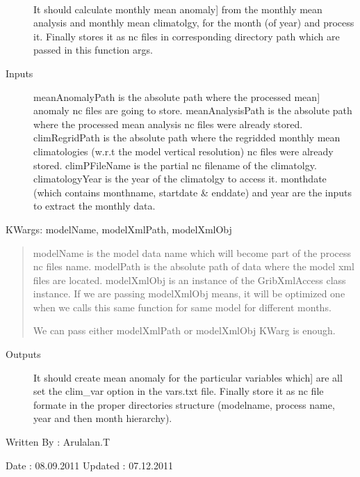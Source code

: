 \documentclass[letterpaper,10pt,english]{sphinxmanual}
\begin{document}
\begin{fulllineitems}
\label{diagnosis:compute_month_anomaly.genMonthAnomalyFiles}~\begin{description}
\item[{}] \leavevmode{[}It should calculate monthly mean anomaly{]}
from the monthly mean analysis and monthly mean climatolgy,
for the month (of year) and process it. Finally
stores it as nc files in corresponding directory path which are
passed in this function args.

\item[{Inputs}] \leavevmode{[}meanAnomalyPath is the absolute path where the processed mean{]}
anomaly nc files are going to store.
meanAnalysisPath is the absolute path where the processed mean
analysis nc files were already stored.
climRegridPath is the absolute path where the regridded monthly
mean climatologies (w.r.t the model vertical resolution)
nc files were already stored.
climPFileName is the partial nc filename of the climatolgy.
climatologyYear is the year of the climatolgy to access it.
monthdate (which contains monthname, startdate \& enddate) and
year are the inputs to extract the monthly data.

\end{description}

KWargs: modelName, modelXmlPath, modelXmlObj
\begin{quote}

modelName is the model data name which will become part of the
process nc files name.
modelPath is the absolute path of data where the model xml files
are located.
modelXmlObj is an instance of the GribXmlAccess class instance.
If we are passing modelXmlObj means, it will be optimized one
when we calls this same function for same model for different
months.

We can pass either modelXmlPath or modelXmlObj KWarg is enough.
\end{quote}
\begin{description}
\item[{Outputs}] \leavevmode{[}It should create mean anomaly for the particular variables which{]}
are all set the clim\_var option in the vars.txt file. Finally
store it as nc file formate in the proper directories structure
(modelname, process name, year and then month hierarchy).

\end{description}

Written By : Arulalan.T

Date : 08.09.2011
Updated : 07.12.2011

\end{fulllineitems}
\end{document}
